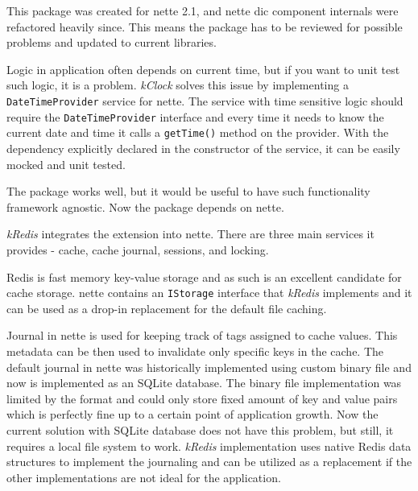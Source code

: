 This package was created for \gls{nette} 2.1, and \gls{nette} \gls{dic} component internals were refactored heavily since. This means the package has to be reviewed for possible problems and updated to current libraries.

 \label{sec:state:clock}

Logic in application often depends on current time, but if you want to unit test such logic, it is a problem. \textit{\gls{kClock}} solves this issue by implementing a \lstinline{DateTimeProvider} service for \gls{nette}. The service with time sensitive logic should require the \lstinline{DateTimeProvider} interface and every time it needs to know the current date and time it calls a \lstinline{getTime()} method on the provider. With the dependency explicitly declared in the constructor of the service, it can be easily mocked and unit tested.

The package works well, but it would be useful to have such functionality framework agnostic. Now the package depends on \gls{nette}.

 \label{sec:state:redis}

\textit{\gls{kRedis}} integrates the  extension  into \gls{nette}. There are three main services it provides - cache, cache journal, sessions, and locking.

Redis is fast memory key-value storage and as such is an excellent candidate for cache storage. \gls{nette} contains an \lstinline{IStorage} interface that \textit{\gls{kRedis}} implements and it can be used as a drop-in replacement for the default file caching.

Journal in \gls{nette} is used for keeping track of tags assigned to cache values. This metadata can be then used to invalidate only specific keys in the cache. The default journal in \gls{nette} was historically implemented using custom binary file and now is implemented as an SQLite database. The binary file implementation was limited by the format and could only store fixed amount of key and value pairs which is perfectly fine up to a certain point of application growth. Now the current solution with SQLite database does not have this problem, but still, it requires a local file system to work. \textit{\gls{kRedis}} implementation uses native Redis data structures to implement the journaling and can be utilized as a replacement if the other implementations are not ideal for the application.

